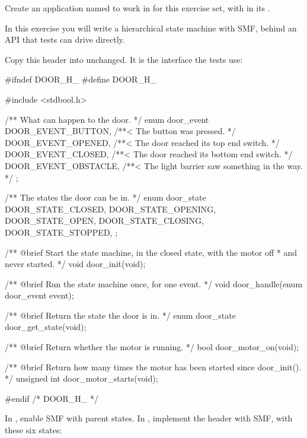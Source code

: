 \label{c4:set:4}
Create an application named  to work in for this exercise set, with
 in its .

\label{c4:ex:4.1}
In this exercise you will write a hierarchical state machine with SMF, behind an API that tests can
drive directly.

Copy this header into  unchanged. It is the interface the tests use:

\begin{ccode}
#ifndef DOOR_H_
#define DOOR_H_

#include <stdbool.h>

/** What can happen to the door. */
enum door_event {
	DOOR_EVENT_BUTTON,   /**< The button was pressed. */
	DOOR_EVENT_OPENED,   /**< The door reached its top end switch. */
	DOOR_EVENT_CLOSED,   /**< The door reached its bottom end switch. */
	DOOR_EVENT_OBSTACLE, /**< The light barrier saw something in the way. */
};

/** The states the door can be in. */
enum door_state {
	DOOR_STATE_CLOSED,
	DOOR_STATE_OPENING,
	DOOR_STATE_OPEN,
	DOOR_STATE_CLOSING,
	DOOR_STATE_STOPPED,
};

/** @brief Start the state machine, in the closed state, with the motor off
 *         and never started. */
void door_init(void);

/** @brief Run the state machine once, for one event. */
void door_handle(enum door_event event);

/** @brief Return the state the door is in. */
enum door_state door_get_state(void);

/** @brief Return whether the motor is running. */
bool door_motor_on(void);

/** @brief Return how many times the motor has been started since door_init(). */
unsigned int door_motor_starts(void);

#endif /* DOOR_H_ */
\end{ccode}

\noindent In , enable SMF with parent states. In , implement the
header with SMF, with these six states:

